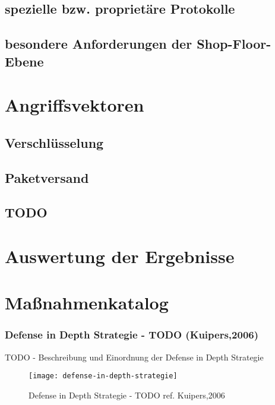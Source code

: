 \subsection{spezielle bzw. proprietäre Protokolle}
\subsection{besondere Anforderungen der Shop-Floor-Ebene}

\section{Angriffsvektoren}
\subsection{Verschlüsselung}
\subsection{Paketversand}
\subsection{TODO}

\section{Auswertung der Ergebnisse}

\section{Maßnahmenkatalog}
\subsubsection{Defense in Depth Strategie - TODO (Kuipers,2006)}

TODO - Beschreibung und Einordnung der Defense in Depth Strategie

\begin{figure}[h]
    \centering
    \texttt{[image: defense-in-depth-strategie]}
    \caption{Defense in Depth Strategie - TODO ref. Kuipers,2006}
    \label{Kap3:Defense-in-Depth}
\end{figure}

